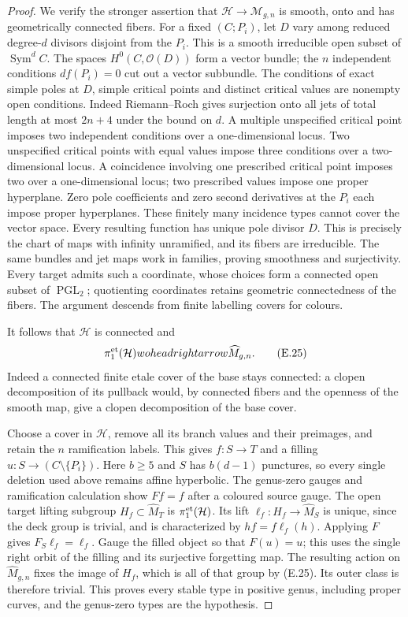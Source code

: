 \begin{proof}
We verify the stronger assertion that
$\mathcal H\to\mathcal M_{g,n}$ is smooth, onto and has
geometrically connected fibers.  For a fixed $(C;P_i)$, let
$D$ vary among reduced degree-$d$ divisors disjoint from the
$P_i$.  This is a smooth irreducible open subset of
$\operatorname{Sym}^d C$.  The spaces $H^0(C,\mathcal O(D))$
form a vector bundle; the $n$ independent conditions
$df(P_i)=0$ cut out a vector subbundle.
The conditions of exact simple poles at $D$, simple critical
points and distinct critical values are nonempty open
conditions.  Indeed Riemann--Roch gives surjection onto all
jets of total length at most $2n+4$ under the bound on $d$.
A multiple unspecified critical point imposes two independent
conditions over a one-dimensional locus.  Two unspecified
critical points with equal values impose three conditions
over a two-dimensional locus.  A coincidence involving one
prescribed critical point imposes two over a one-dimensional
locus; two prescribed values impose one proper hyperplane.
Zero pole coefficients and zero second derivatives at the
$P_i$ each impose proper hyperplanes.  These finitely many
incidence types cannot cover the vector space.
Every resulting function has unique pole divisor $D$.
This is precisely the chart of maps with infinity unramified,
and its fibers are irreducible.  The same bundles and jet
maps work in families, proving smoothness and surjectivity.
Every target admits such a coordinate, whose choices form a
connected open subset of $\operatorname{PGL}_2$; quotienting
coordinates retains geometric connectedness of the fibers.
The argument descends from finite labelling covers for colours.

It follows that $\mathcal H$ is connected and
\[
             \pi_1^{\rm et}(\mathcal H)	woheadrightarrow
                          \widehat M_{g,n}.               \tag{E.25}
\]
Indeed a connected finite etale cover of the base stays
connected: a clopen decomposition of its pullback would,
by connected fibers and the openness of the smooth map,
give a clopen decomposition of the base cover.

Choose a cover in $\mathcal H$, remove all its branch values
and their preimages, and retain the $n$ ramification labels.
This gives $f:S\to T$ and a filling $u:S\to(C\setminus\{P_i\})$.
Here $b\geq5$ and $S$ has $b(d-1)$ punctures, so every
single deletion used above remains affine hyperbolic.
The genus-zero gauges and ramification calculation show
$Ff=f$ after a coloured source gauge.  The open target
lifting subgroup $H_f\subset\widehat M_T$ is
$\pi_1^{\rm et}(\mathcal H)$.  Its lift
$\ell_f:H_f\to\widehat M_S$ is unique, since the deck group
is trivial, and is characterized by $hf=f\ell_f(h)$.
Applying $F$ gives $F_S\ell_f=\ell_f$.
Gauge the filled object so that $F(u)=u$; this uses the single
right orbit of the filling and its surjective forgetting map.
The resulting action on $\widehat M_{g,n}$ fixes the image
of $H_f$, which is all of that group by (E.25).
Its outer class is therefore trivial.  This proves every
stable type in positive genus, including proper curves, and
the genus-zero types are the hypothesis.
\end{proof}

